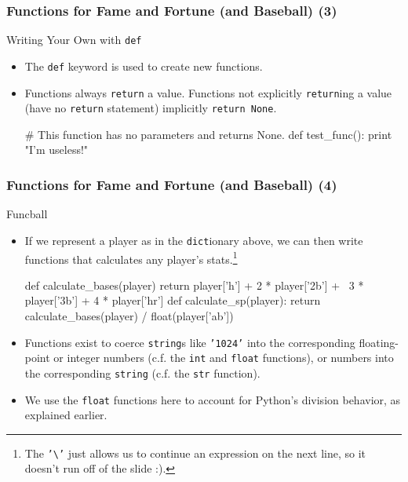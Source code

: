 \documentclass[10pt]{beamer}
\begin{document}
\begin{frame}[fragile]
  \frametitle{Functions for Fame and Fortune (and Baseball) (3)}
  \begin{block}{Writing Your Own with \texttt{def}}
    \begin{itemize}
      \item The \texttt{def} keyword is used to create new functions.
      \item Functions always \texttt{return} a value. 
        Functions not explicitly \texttt{return}ing a value (have no \texttt{return} statement) implicitly \texttt{return None}.
        \begin{pythoncode}
  # This function has no parameters and returns None.
  def test_func():
    print "I'm useless!"
        \end{pythoncode}
    \end{itemize}
  \end{block}
\end{frame}

\begin{frame}[fragile]
  \frametitle{Functions for Fame and Fortune (and Baseball) (4)}
  \begin{block}{Funcball}
    \begin{itemize}
      \item If we represent a player as in the \texttt{dict}ionary above, we can then write functions that calculates any player's stats.\footnote{The \texttt{'\textbackslash'} just allows us to continue an expression on the next line, so it doesn't run off of the slide :).}
      \footnotesize
      \begin{pythoncode}
  def calculate_bases(player)
    return player['h'] + 2 * player['2b'] + \
      3 * player['3b'] + 4 * player['hr']
  def calculate_sp(player):
    return calculate_bases(player) / float(player['ab'])
      \end{pythoncode}
      \normalsize
      \item Functions exist to coerce \texttt{string}s like \texttt{'1024'} into the corresponding floating-point or integer numbers (c.f. the \texttt{int} and \texttt{float} functions), or numbers into the corresponding \texttt{string} (c.f. the \texttt{str} function).
      \item We use the \texttt{float} functions here to account for Python's division behavior, as explained earlier.
    \end{itemize}
  \end{block}
\end{frame}
\end{document}
